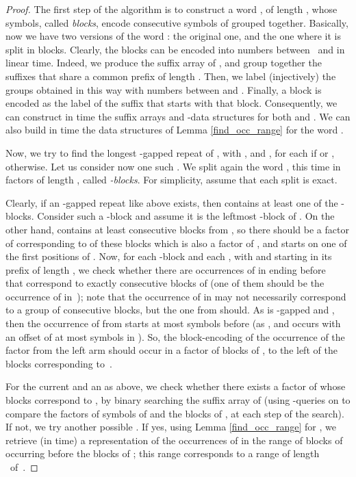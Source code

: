 \documentclass[final]{dmtcs-episciences}
\begin{document}
\begin{proof}
The first step of the algorithm is to construct a word , of length , whose symbols, called {\em blocks}, encode  consecutive symbols of  grouped together. Basically, now we have two versions of the word : the original one, and the one where it is split in blocks. Clearly, the blocks can be encoded into numbers between~ and  in linear time. Indeed, we produce the suffix array of , and group together the suffixes that share a common prefix of length . Then, we label (injectively) the groups obtained in this way with numbers between  and . Finally, a block is encoded as the label of the suffix that starts with that block. Consequently, we can construct in  time the suffix arrays and -data structures for both  and . We can also build in  time the data structures of Lemma \ref{find_occ_range} for the word . 

Now, we try to find the longest -gapped repeat  of , with , and , for each  if  or , otherwise. Let us consider now one such . We split again the word , this time in factors of length , called {\em -blocks}. For simplicity, assume that each split is exact. 

Clearly, if an -gapped repeat  like above exists, then  contains at least one of the -blocks. Consider such a -block  and assume it is the leftmost -block of . On the other hand,  contains at least  consecutive blocks from , so there should be a factor  of  corresponding to  of these  blocks which is also a factor of , and starts on one of the first  positions of . Now, for each -block  and each , with  and starting in its prefix of length , we check whether there are occurrences of  in  ending before~ that correspond to exactly  consecutive blocks of  (one of them should be the occurrence of  in~); note that the occurrence of  in  may not necessarily correspond to a group of  consecutive blocks, but the one from  should. As  is -gapped and , then the occurrence of  from  starts at most  symbols before  (as , and  occurs with an offset of at most  symbols in ). So, the block-encoding of the occurrence of the factor  from the left arm  should occur in a factor of  blocks of , to the left of the blocks corresponding to~.

For the current  and an  as above, we check whether there exists a factor  of  whose blocks correspond to , by binary searching the suffix array of  (using -queries on  to compare the factors of  symbols of  and the blocks of , at each step of the search). If not, we try another possible . If yes, using Lemma \ref{find_occ_range} for , we retrieve (in  time) a representation of the occurrences of  in the range of  blocks of~ occurring before the blocks of ; this range corresponds to a range of length ~of~. 


\end{proof}
\end{document}
